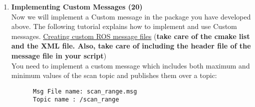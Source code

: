 \documentclass[letta4 paper]{article}
\begin{document}
\begin{enumerate}
    Now we will process the data we have received from the lidar and publish it over some topic. 
    \\
    Find out the maximum value in the lidar data ( the farthest point which is the range in meters) and the minimum value(the closest point which is the range in meters). Publishin them over two separate topics,
    \begin{lstlisting}
      \closest_point
      \farthest_point
    \end{lstlisting}{}
    Keep the data type ( message type) for both the topics as Float64. \\
    \begin{enumerate}
        \item (\textbf{C++})What is a nodehandle object? Can we have more than one nodehandle objects in a single node ? 
        \item (\textbf{Python}) Is there a nodehandle object in python? What is the significance of rospy.init\_node()
        \item (\textbf{C++})What is ros::spinOnce()?How is it different from ros::Spin()
        \item (\textbf{C++})What is ros::rate() ? 
        \item (\textbf{Python}) How do you control callbacks in python for the subscribers ? Do you need spin() or spinonce() in python?
    \end{enumerate}{}
    
    
    \item \textbf{Implementing Custom Messages (20)}\\
    Now we will implement a Custom message in the package you have developed above. The following tutorial explains how to implement and use Custom messages. 
    \href{http://wiki.ros.org/ROS/Tutorials/CreatingMsgAndSrv}{ Creating custom ROS message files}
    (\textbf{take care of the cmake list and the XML file. Also, take care of including the header file of the message file in your script})\\
    You need to implement a custom message which includes both maximum and minimum values of the scan topic and publishes them over a topic: 
    \begin{lstlisting}
      Msg File name: scan_range.msg
      Topic name : /scan_range
    \end{lstlisting}{}
    

\end{enumerate}
\end{document}
